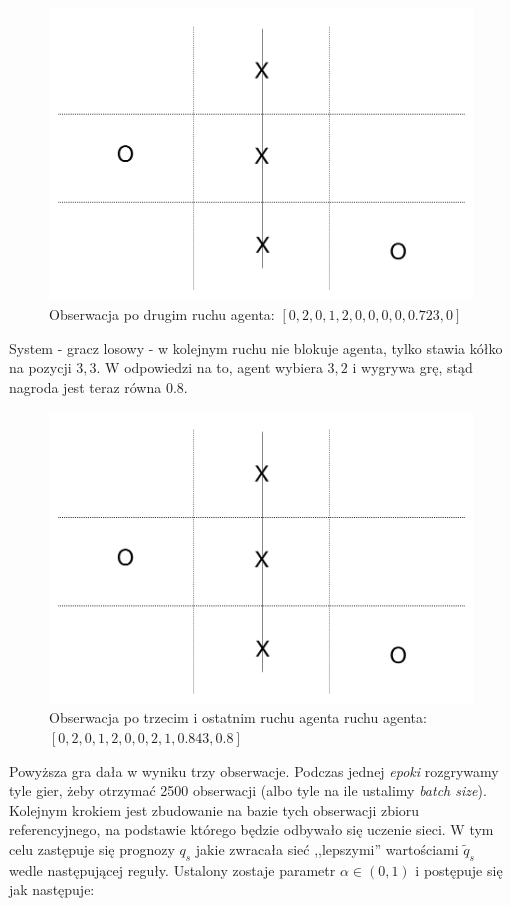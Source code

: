 \documentclass[licencjacka]{pracamgr}
\begin{document}
\begin{figure}[H]
	\includegraphics [scale=0.2] {ttt_7.png}
	\caption{Obserwacja po drugim ruchu agenta:  $[0, 2, 0, 1, 2, 0, 0, 0, 0, 0.723, 0]$}
	\label{Rys28}
\end{figure} 

System - gracz losowy - w kolejnym ruchu nie blokuje agenta, tylko stawia kółko na pozycji $3,3$. W odpowiedzi na to, agent wybiera $3,2$ i wygrywa grę, stąd nagroda jest teraz równa $0.8$.

\begin{figure}[H]
	\includegraphics [scale=0.2] {ttt_8.png}
	\caption{Obserwacja po trzecim i ostatnim ruchu agenta ruchu agenta:  $[0, 2, 0, 1, 2, 0, 0, 2, 1, 0.843, 0.8]$}
	\label{Rys29}
\end{figure} 


Powyższa gra dała w wyniku trzy obserwacje. Podczas jednej \textit{epoki} rozgrywamy tyle gier, żeby otrzymać 2500 obserwacji (albo tyle na ile ustalimy \textit{batch size}). Kolejnym krokiem jest zbudowanie na bazie tych obserwacji zbioru referencyjnego, na podstawie którego będzie odbywało się uczenie sieci. W tym celu zastępuje się prognozy $q_{s}$ jakie zwracała sieć ,,lepszymi'' wartościami $\tilde{q}_{s}$ wedle następującej reguły.  Ustalony zostaje parametr $\alpha\in(0,1)$ i postępuje się jak następuje:
\end{document}
